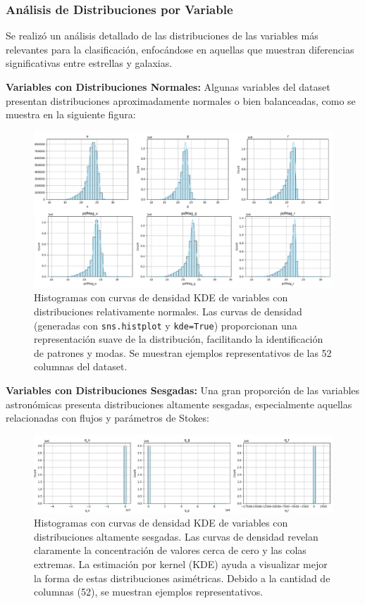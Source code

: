 \documentclass{article}
\begin{document}
\subsubsection{Análisis de Distribuciones por Variable}

Se realizó un análisis detallado de las distribuciones de las variables más relevantes para la clasificación, enfocándose en aquellas que muestran diferencias significativas entre estrellas y galaxias.

\textbf{Variables con Distribuciones Normales:}
Algunas variables del dataset presentan distribuciones aproximadamente normales o bien balanceadas, como se muestra en la siguiente figura:

\begin{figure}[H]
    \centering
    \includegraphics[width=1.0\linewidth]{variables_normales.png}
    \caption{Histogramas con curvas de densidad KDE de variables con distribuciones relativamente normales. Las curvas de densidad (generadas con \texttt{sns.histplot} y \texttt{kde=True}) proporcionan una representación suave de la distribución, facilitando la identificación de patrones y modas. Se muestran ejemplos representativos de las 52 columnas del dataset.}
    \label{fig:variables_normales}
\end{figure}

\textbf{Variables con Distribuciones Sesgadas:}
Una gran proporción de las variables astronómicas presenta distribuciones altamente sesgadas, especialmente aquellas relacionadas con flujos y parámetros de Stokes:

\begin{figure}[H]
    \centering
    \includegraphics[width=1.0\linewidth]{variables_sesgadas.png}
    \caption{Histogramas con curvas de densidad KDE de variables con distribuciones altamente sesgadas. Las curvas de densidad revelan claramente la concentración de valores cerca de cero y las colas extremas. La estimación por kernel (KDE) ayuda a visualizar mejor la forma de estas distribuciones asimétricas. Debido a la cantidad de columnas (52), se muestran ejemplos representativos.}
    \label{fig:variables_sesgadas}
\end{figure}
\end{document}
